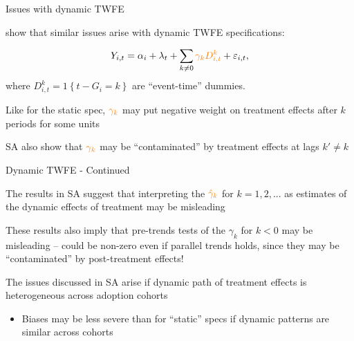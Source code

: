 \documentclass[usenames, dvipsnames, aspectratio = 169, 13pt]{beamer}
\newenvironment{wideitemize}{\itemize\addtolength{\itemsep}{10pt}}{\enditemize}
\begin{document}
\begin{frame}{Issues with dynamic TWFE}
\begin{wideitemize}
    \item
    \citet{sun_estimating_2020} show that similar issues arise with dynamic TWFE specifications:
    
      \begin{equation*}
    Y_{i,t} = \alpha_i + \lambda_t +  \sum_{k \neq 0} \textcolor{orange}{ \gamma_k D_{i,t}^{k}} + \varepsilon_{i,t},\bigskip
    \end{equation*}
    where $D_{i,t}^{k} = 1\left\{t-G_{i}=k\right\}$ are ``event-time'' dummies. \bigskip
    
    \item
    Like for the static spec, $\textcolor{orange}{\gamma_k}$ may put negative weight on treatment effects after $k$ periods for some units
    
    \item
    SA also show that $\textcolor{orange}{\gamma_k}$ may be ``contaminated'' by treatment effects at lags $k' \neq k$
    

\end{wideitemize}
    
\end{frame}


\begin{frame}{Dynamic TWFE - Continued}

\begin{wideitemize}
    
    \item
    The results in SA suggest that interpreting the $\textcolor{orange}{\hat\gamma_k}$ for $k=1,2,...$ as estimates of the dynamic effects of treatment may be misleading
    

    \item
    These results also imply that pre-trends tests of the $\gamma_k$ for $k<0$ may be misleading -- could be non-zero even if parallel trends holds, since they may be ``contaminated'' by post-treatment effects!
    \pause
    
    \item
    The issues discussed in SA arise if dynamic path of treatment effects is heterogeneous across adoption cohorts 
        \begin{itemize}
            \item 
            Biases may be less severe than for ``static'' specs if dynamic patterns are similar across cohorts
        \end{itemize}

        
\end{wideitemize}

\end{frame}
\end{document}
